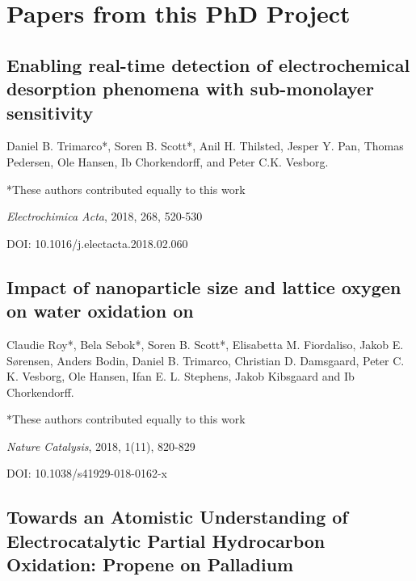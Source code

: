 \chapter{Papers from this PhD Project}
		
		\renewcommand{\thesection}{\Roman{section}}
		\titleformat{\section}{\normalfont\Large\bfseries}{Paper~\thesection}{1em}{}	
		
		\section{Enabling real-time detection of electrochemical desorption phenomena with sub-monolayer sensitivity}\label{Trimarco2018}
		
		Daniel B. Trimarco*, Soren B. Scott*, Anil H. Thilsted, Jesper Y. Pan, Thomas Pedersen, Ole Hansen, Ib Chorkendorff, and Peter C.K. Vesborg. 
		
		*These authors contributed equally to this work
		
		\textit{Electrochimica Acta}, 2018, 268, 520-530
		
		DOI: 10.1016/j.electacta.2018.02.060
		
		
		
		
		
		
		\clearpage
		\section{Impact of nanoparticle size and lattice oxygen on water oxidation on }\label{Roy2018}
		
		Claudie Roy*, Bela Sebok*, Soren B. Scott*, Elisabetta M. Fiordaliso, Jakob E. Sørensen, Anders Bodin, Daniel B. Trimarco, Christian D. Damsgaard, Peter C. K. Vesborg, Ole Hansen, Ifan E. L. Stephens, Jakob Kibsgaard and Ib Chorkendorff. 
		
		*These authors contributed equally to this work
		
		\textit{Nature Catalysis}, 2018, 1(11), 820-829 
		
		DOI: 10.1038/s41929-018-0162-x
		
			
		
		
		
		
		
		\clearpage
		\section{Towards an Atomistic Understanding of Electrocatalytic Partial Hydrocarbon Oxidation: Propene on Palladium}\label{Winiwarter2019}
		
